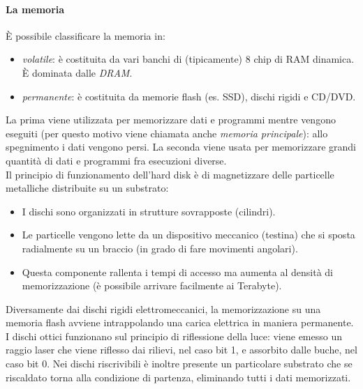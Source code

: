 \paragraph*{La memoria}
\`{E} possibile classificare la memoria in:
\begin{itemize}[noitemsep]
	\item \textit{volatile}: è costituita da vari banchi di (tipicamente) 8 chip di RAM dinamica. \`{E} dominata dalle \textit{DRAM}.
	\item \textit{permanente}: è costituita da memorie flash (es. SSD), dischi rigidi e CD/DVD.
\end{itemize}
La prima viene utilizzata per memorizzare dati e programmi mentre vengono eseguiti (per questo motivo viene chiamata anche \textit{memoria principale}): allo spegnimento i dati vengono persi. La seconda viene usata per memorizzare grandi quantità di dati e programmi fra esecuzioni diverse.\\
Il principio di funzionamento dell'hard disk è di magnetizzare delle particelle metalliche distribuite su un substrato:
\begin{itemize}[noitemsep]
	\item I dischi sono organizzati in strutture sovrapposte (cilindri).
	\item Le particelle vengono lette da un dispositivo meccanico (testina) che si sposta radialmente su un braccio (in grado di fare movimenti angolari).
	\item Questa componente rallenta i tempi di accesso ma aumenta al densità di memorizzazione (è possibile arrivare facilmente ai Terabyte).
\end{itemize}

Diversamente dai dischi rigidi elettromeccanici, la memorizzazione su una memoria flash avviene intrappolando una carica elettrica in maniera permanente.\\
I dischi ottici funzionano sul principio di riflessione della luce: viene emesso un raggio laser che viene riflesso dai rilievi, nel caso bit 1, e assorbito dalle buche, nel caso bit 0. Nei dischi riscrivibili è inoltre presente un particolare substrato che se riscaldato torna alla condizione di partenza, eliminando tutti i dati memorizzati.

